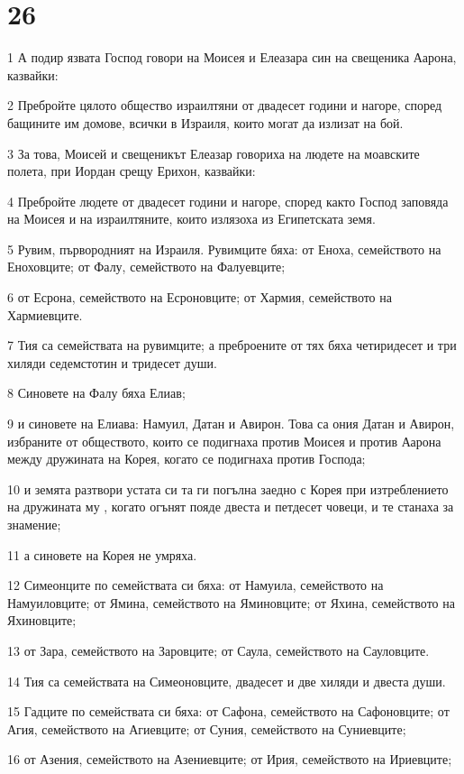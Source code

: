\chapter{26}

\par 1 А подир язвата Господ говори на Моисея и Елеазара син на свещеника Аарона, казвайки:
\par 2 Пребройте цялото общество израилтяни от двадесет години и нагоре, според бащините им домове, всички в Израиля, които могат да излизат на бой.
\par 3 За това, Моисей и свещеникът Елеазар говориха на людете на моавските полета, при Иордан срещу Ерихон, казвайки:
\par 4 Пребройте людете от двадесет години и нагоре, според както Господ заповяда на Моисея и на израилтяните, които излязоха из Египетската земя.
\par 5 Рувим, първородният на Израиля. Рувимците бяха: от Еноха, семейството на Еноховците; от Фалу, семейството на Фалуевците;
\par 6 от Есрона, семейството на Есроновците; от Хармия, семейството на Хармиевците.
\par 7 Тия са семействата на рувимците; а преброените от тях бяха четиридесет и три хиляди седемстотин и тридесет души.
\par 8 Синовете на Фалу бяха Елиав;
\par 9 и синовете на Елиава: Намуил, Датан и Авирон. Това са ония Датан и Авирон, избраните от обществото, които се подигнаха против Моисея и против Аарона между дружината на Корея, когато се подигнаха против Господа;
\par 10 и земята разтвори устата си та ги погълна заедно с Корея при изтреблението на дружината му , когато огънят пояде двеста и петдесет човеци, и те станаха за знамение;
\par 11 а синовете на Корея не умряха.
\par 12 Симеонците по семействата си бяха: от Намуила, семейството на Намуиловците; от Ямина, семейството на Яминовците; от Яхина, семейството на Яхиновците;
\par 13 от Зара, семейството на Заровците; от Саула, семейството на Сауловците.
\par 14 Тия са семействата на Симеоновците, двадесет и две хиляди и двеста души.
\par 15 Гадците по семействата си бяха: от Сафона, семейството на Сафоновците; от Агия, семейството на Агиевците; от Суния, семейството на Суниевците;
\par 16 от Азения, семейството на Азениевците; от Ирия, семейството на Ириевците;
